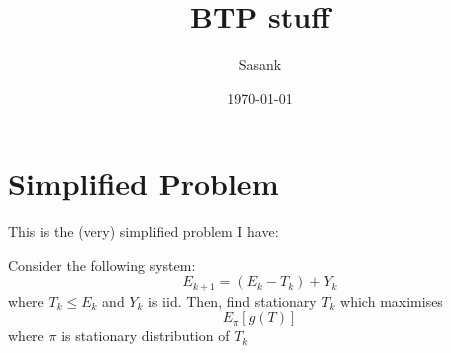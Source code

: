 \documentclass[a4paper]{article}
\begin{document}
\title{BTP stuff}
\author{Sasank}
\date{\today}
\maketitle

\section{Simplified Problem}
This is the (very) simplified problem I have:

Consider the following system:
\[
E_{k+1} = (E_k - T_k) + Y_k
\]
where $T_k \leq E_k$ and $Y_k$ is iid. Then, find stationary $T_k$ which maximises 
\[
E_\pi[g(T)]
\]
where $\pi$ is stationary distribution of $T_k$
\end{document}
